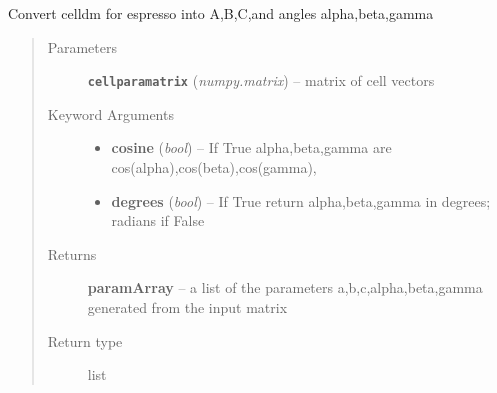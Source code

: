 \documentclass[letterpaper,10pt,english]{sphinxmanual}
\begin{document}
\begin{fulllineitems}
\label{retr:retr.celldm2abc}
Convert celldm for espresso into A,B,C,and angles alpha,beta,gamma
\begin{quote}\begin{description}
\item[{Parameters}] \leavevmode
\textbf{\texttt{cellparamatrix}} (\emph{numpy.matrix}) -- matrix of cell vectors

\item[{Keyword Arguments}] \leavevmode\begin{itemize}
\item {} 
\textbf{cosine} (\emph{bool}) --
If True alpha,beta,gamma are cos(alpha),cos(beta),cos(gamma),

\item {} 
\textbf{degrees} (\emph{bool}) --
If True return alpha,beta,gamma in degrees; radians if False

\end{itemize}

\item[{Returns}] \leavevmode
\textbf{paramArray} --
a list of the parameters a,b,c,alpha,beta,gamma generated from the input matrix

\item[{Return type}] \leavevmode
list

\end{description}\end{quote}

\end{fulllineitems}

\end{document}
